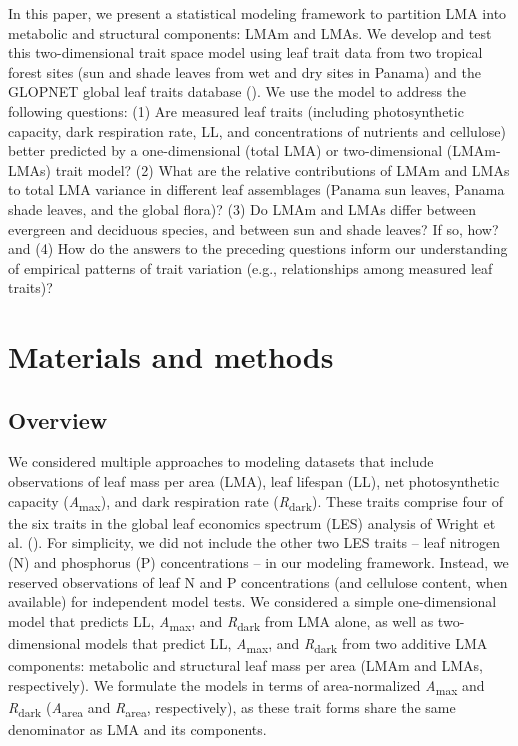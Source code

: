 \documentclass[
  12pt,
  letterpaper,
  DIV=11,
  numbers=noendperiod]{scrartcl}
\begin{document}
In this paper, we present a statistical modeling framework to partition
LMA into metabolic and structural components: LMAm and LMAs. We develop
and test this two-dimensional trait space model using leaf trait data
from two tropical forest sites (sun and shade leaves from wet and dry
sites in Panama) and the GLOPNET global leaf traits database
(). We use the model to
address the following questions: (1) Are measured leaf traits (including
photosynthetic capacity, dark respiration rate, LL, and concentrations
of nutrients and cellulose) better predicted by a one-dimensional (total
LMA) or two-dimensional (LMAm-LMAs) trait model? (2) What are the
relative contributions of LMAm and LMAs to total LMA variance in
different leaf assemblages (Panama sun leaves, Panama shade leaves, and
the global flora)? (3) Do LMAm and LMAs differ between evergreen and
deciduous species, and between sun and shade leaves? If so, how? and (4)
How do the answers to the preceding questions inform our understanding
of empirical patterns of trait variation (e.g., relationships among
measured leaf traits)?

\section{Materials and methods}\label{materials-and-methods}

\subsection{Overview}\label{overview}

We considered multiple approaches to modeling datasets that include
observations of leaf mass per area (LMA), leaf lifespan (LL), net
photosynthetic capacity (\emph{A}\textsubscript{max}), and dark
respiration rate (\emph{R}\textsubscript{dark}). These traits comprise
four of the six traits in the global leaf economics spectrum (LES)
analysis of Wright et al. (). For
simplicity, we did not include the other two LES traits -- leaf nitrogen
(N) and phosphorus (P) concentrations -- in our modeling framework.
Instead, we reserved observations of leaf N and P concentrations (and
cellulose content, when available) for independent model tests. We
considered a simple one-dimensional model that predicts LL,
\emph{A}\textsubscript{max}, and \emph{R}\textsubscript{dark} from LMA
alone, as well as two-dimensional models that predict LL,
\emph{A}\textsubscript{max}, and \emph{R}\textsubscript{dark} from two
additive LMA components: metabolic and structural leaf mass per area
(LMAm and LMAs, respectively). We formulate the models in terms of
area-normalized \emph{A}\textsubscript{max} and
\emph{R}\textsubscript{dark} (\emph{A}\textsubscript{area} and
\emph{R}\textsubscript{area}, respectively), as these trait forms share
the same denominator as LMA and its components.
\end{document}
